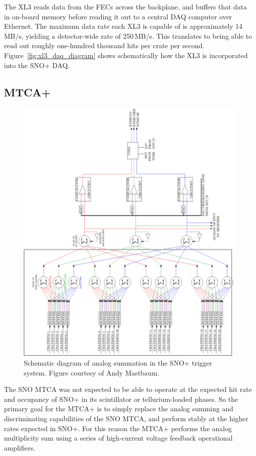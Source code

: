 The XL3 reads data from the FECs across the backplane, and buffers that data
in on-board memory before reading it out to a central DAQ computer over Ethernet.
The maximum data rate each XL3 is capable of is approximately
14\,MB/s, yielding a detector-wide rate of 250\,MB/s.
This translates to being able to read out roughly one-hundred thousand
hits per crate per second.
Figure~\ref{fig:xl3_daq_diagram} shows schematically how the XL3 is
incorporated into the SNO+ DAQ\@.

\subsection{MTCA+}
\label{sec:mtcap}
\begin{figure}[htbp]
    \centering
    \includegraphics[width=1\textwidth]{mtcap_analog_diagram}
    \caption[MTCA+ Analog Diagram]{Schematic diagram of analog
    summation in the SNO+ trigger system. Figure courtesy of
    Andy Mastbaum.}%
\label{fig:mtcap_analog_diagram}
\end{figure}

The SNO MTCA was not expected to be able to operate at the expected
hit rate and occupancy of SNO+ in its scintillator or tellurium-loaded phases.
So the primary goal for the MTCA+ is to simply replace the analog summing
and discriminating capabilities of the SNO MTCA, and perform stably
at the higher rates expected in SNO+.
For this reason the MTCA+ performs the analog multiplicity sum using a series
of high-current voltage feedback operational amplifiers.

